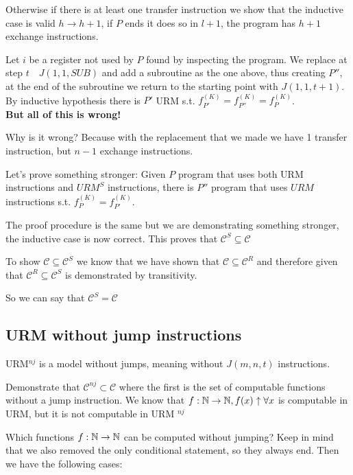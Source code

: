 Otherwise if there is at least one transfer instruction we show that the inductive case is valid $ h \rightarrow h+1 $, if $P$ ends it does so in $l + 1$, the program has $h + 1$ exchange instructions.

Let $i$ be a register not used by $P$ found by inspecting the program. We replace at step $t \quad J (1,1, SUB)$ and add a subroutine as the one above, thus creating $ P'' $, at the end of the subroutine we return to the starting point with $J (1,1, t + 1)$. By inductive hypothesis there is $ P' $ URM s.t. $ f_{P'}^{(K)} = f_{P''}^{(K)} = f_{P}^{(K)}$. \\
\textbf{But all of this is wrong!}

Why is it wrong? Because with the replacement that we made we have 1 transfer instruction, but $n-1$ exchange instructions.

Let's prove something stronger: Given $P$ program that uses both URM instructions and  $URM^S $ instructions, there is $ P'' $ program that uses $URM$ instructions s.t. $ f_{P}^{(K)} = f_{P'}^{(K)} $.

The proof procedure is the same but we are demonstrating something stronger, the inductive case is now correct. This proves that $ \mathcal{C}^S \subseteq \mathcal{C} $

To show $  \mathcal{C} \subseteq \mathcal{C}^S $ we know that we have shown that $ \mathcal{C} \subseteq \mathcal{C}^R $ and therefore given that $ \mathcal{C}^R \subseteq \mathcal{C}^S $ is demonstrated by transitivity.

So we can say that $ \mathcal{C}^S = \mathcal{C} $

\subsection{URM without jump instructions}

URM$ ^{nj} $ is a model without jumps, meaning without $J(m,n,t)$ instructions.

Demonstrate that $ \mathcal{C}^{nj} \subset \mathcal{C} $ where the first is the set of computable functions without a jump instruction. We know that $ f: \mathbb{N} \rightarrow \mathbb{N}, f(x)\uparrow \forall x $ is computable in URM, but it is not computable in URM $ ^{nj} $

Which functions $ f: \mathbb{N} \rightarrow \mathbb{N} $ can be computed without jumping? Keep in mind that we also removed the only conditional statement, so they always end. Then we have the following cases:

